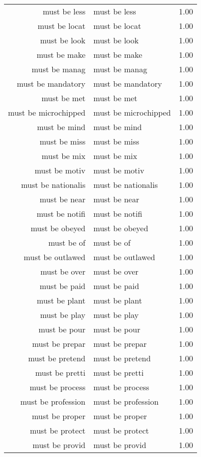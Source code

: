 \begin{table}[ht]
\begin{tabular}{rlr}
  must be less & must be less & 1.00 \\ 
  must be locat & must be locat & 1.00 \\ 
  must be look & must be look & 1.00 \\ 
  must be make & must be make & 1.00 \\ 
  must be manag & must be manag & 1.00 \\ 
  must be mandatory & must be mandatory & 1.00 \\ 
  must be met & must be met & 1.00 \\ 
  must be microchipped & must be microchipped & 1.00 \\ 
  must be mind & must be mind & 1.00 \\ 
  must be miss & must be miss & 1.00 \\ 
  must be mix & must be mix & 1.00 \\ 
  must be motiv & must be motiv & 1.00 \\ 
  must be nationalis & must be nationalis & 1.00 \\ 
  must be near & must be near & 1.00 \\ 
  must be notifi & must be notifi & 1.00 \\ 
  must be obeyed & must be obeyed & 1.00 \\ 
  must be of & must be of & 1.00 \\ 
  must be outlawed & must be outlawed & 1.00 \\ 
  must be over & must be over & 1.00 \\ 
  must be paid & must be paid & 1.00 \\ 
  must be plant & must be plant & 1.00 \\ 
  must be play & must be play & 1.00 \\ 
  must be pour & must be pour & 1.00 \\ 
  must be prepar & must be prepar & 1.00 \\ 
  must be pretend & must be pretend & 1.00 \\ 
  must be pretti & must be pretti & 1.00 \\ 
  must be process & must be process & 1.00 \\ 
  must be profession & must be profession & 1.00 \\ 
  must be proper & must be proper & 1.00 \\ 
  must be protect & must be protect & 1.00 \\ 
  must be provid & must be provid & 1.00 \\ 

\end{tabular}
\end{table}
